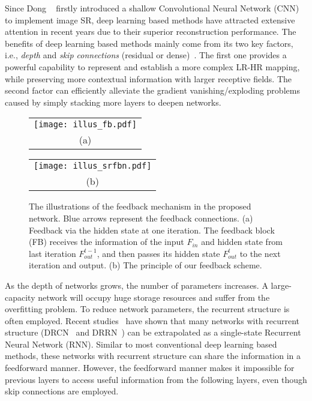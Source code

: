 \documentclass[10pt,twocolumn,letterpaper]{article}
\begin{document}
	Since Dong \etal~\cite{dong2014learning} firstly introduced a shallow Convolutional Neural Network (CNN) to implement image SR, deep learning based methods have attracted extensive attention in recent years due to their superior reconstruction performance. The benefits of deep learning based methods mainly come from its two key factors, i.e., \textit{depth} and \textit{skip connections} (residual or dense)~\cite{Kim_2016_CVPR, Tong_2017_ICCV, Tai_2017_CVPR, Haris_2018_CVPR, Zhang_2018_CVPR, zhang2018rcan, wang2018esrgan}. The first one provides a powerful capability to represent and establish a more complex LR-HR mapping, while preserving more contextual information with larger receptive fields. The second factor can efficiently alleviate the gradient vanishing/exploding problems caused by simply stacking more layers to deepen networks.
	
	\begin{figure}[t]
		\begin{center}
			\begin{tabular}{@{}c@{}}
				\texttt{[image: illus\_fb.pdf]}\\


				\small (a)
			\end{tabular}
			\begin{tabular}{@{}c@{}}
				\texttt{[image: illus\_srfbn.pdf]}\\


				\small (b)
			\end{tabular}


		\end{center}
		\caption{The illustrations of the feedback mechanism in the proposed network. Blue arrows represent the feedback connections. (a) Feedback via the hidden state at one iteration. The feedback block (FB) receives the information of the input $F_{in}$ and hidden state from last iteration $F_{out}^{t-1}$, and then passes its hidden state $F_{out}^{t}$ to the next iteration and output. (b) The principle of our feedback scheme.}
		\label{fig:illus_fb}	
		\vspace{-0.45cm}
	\end{figure}
	
	As the depth of networks grows, the number of parameters increases. A large-capacity network will occupy huge storage resources and suffer from the overfitting problem. To reduce network parameters, the recurrent structure is often employed. Recent studies~\cite{liao2016bridging, Han_2018_CVPR} have shown that many networks with recurrent structure (\eg DRCN~\cite{Kim_2016_CVPR_DRCN} and DRRN~\cite{Tai_2017_CVPR}) can be extrapolated as a single-state Recurrent Neural Network (RNN). Similar to most conventional deep learning based methods, these networks with recurrent structure can share the information in a feedforward manner. However, the feedforward manner makes it impossible for previous layers to access useful information from the following layers, even though skip connections are employed.
	
\end{document}
